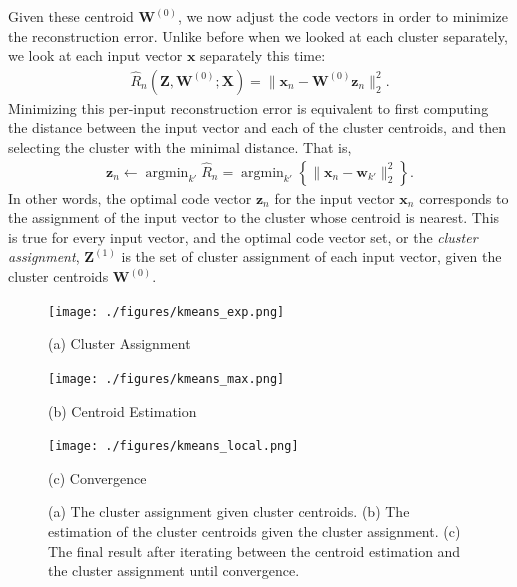 \documentclass{report}
\newcommand{\vect}[1]{\mathbf{#1}}
\newcommand{\matr}[1]{\mathbf{#1}}
\newcommand{\vx}[0]{\vect{x}}
\newcommand{\vz}[0]{\vect{z}}
\newcommand{\vw}[0]{\vect{w}}
\newcommand{\mW}[0]{\matr{W}}
\newcommand{\mZ}[0]{\matr{Z}}
\newcommand{\mX}[0]{\matr{X}}
\DeclareMathOperator*{\argmin}{\arg \min}
\begin{document}
Given these centroid $\mW^{(0)}$, we now adjust the code vectors in order to
minimize the reconstruction error. Unlike before when we looked at each cluster
separately, we look at each input vector $\vx$ separately this time:
\begin{align*}
    \hat{R}_n(\mZ, \mW^{(0)}; \mX) =
    \| \vx_n - \mW^{(0)} \vz_n \|_2^2.
\end{align*}
Minimizing this per-input reconstruction error is equivalent to first computing
the distance between the input vector and each of the cluster centroids, and
then selecting the cluster with the minimal distance. That is,
\begin{align}
    \label{eq:km_exp}
    \vz_n \leftarrow 
    \argmin_{k'} \hat{R}_n = \argmin_{k'} 
    \left\{
        \| \vx_n - \vw_{k'}\|_2^2
    \right\}.
\end{align}
In other words, the optimal code vector $\vz_n$ for the input vector $\vx_n$
corresponds to the assignment of the input vector to the cluster whose
centroid is nearest.  This is true for every input vector, and the optimal code
vector set, or the {\it cluster assignment}, $\mZ^{(1)}$ is the set of cluster
assignment of each input vector, given the cluster centroids $\mW^{(0)}$. 

\begin{figure}[t]
    \begin{minipage}{0.32\textwidth}
        \centering
        \texttt{[image: ./figures/kmeans\_exp.png]}

        (a) Cluster Assignment
    \end{minipage}
    \hfill
    \begin{minipage}{0.32\textwidth}
        \centering
        \texttt{[image: ./figures/kmeans\_max.png]}

        (b) Centroid Estimation
    \end{minipage}
    \hfill
    \begin{minipage}{0.32\textwidth}
        \centering
        \texttt{[image: ./figures/kmeans\_local.png]}

        (c) Convergence
    \end{minipage}
    \caption{
        \label{fig:kmeans1}
        (a) The cluster assignment given cluster centroids.  (b) The estimation
        of the cluster centroids given the cluster assignment.
        (c) The final result after
        iterating between the centroid estimation and the cluster assignment
        until convergence. 
    }
\end{figure}
\end{document}
